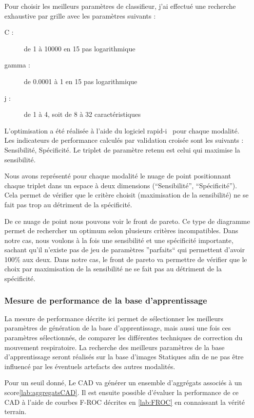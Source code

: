 Pour choisir les meilleurs paramètres de classifieur, j'ai effectué une recherche exhaustive par grille avec les paramètres suivants :

\begin{description}
 \item [C :] de 1 à 10000 en 15 pas logarithmique
 \item [gamma :] de 0.0001 à 1 en 15 pas logarithmique
 \item [j :] de 1 à 4, soit de 8 à 32 caractéristiques
\end{description}

L'optimisation a été réalisée à l'aide du logiciel rapid-i~\cite{mierswa2006} pour chaque modalité. Les indicateurs de performance calculés par validation croisée sont les suivants : Sensibilité, Spécificité. Le triplet de paramètre retenu est celui qui maximise la sensibilité.

Nous avons représenté pour chaque modalité le nuage de point positionnant chaque triplet dans un espace à deux dimensions (``Sensibilité'', ``Spécificité''). Cela permet de vérifier que le critère choisit (maximisation de la sensibilité) ne se fait pas trop au détriment de la spécificité.

De ce nuage de point nous pouvons voir le front de pareto. Ce type de diagramme permet de rechercher un optimum selon plusieurs critères incompatibles. Dans notre cas, nous voulons à la fois une sensibilité et une spécificité importante, sachant qu'il n'existe pas de jeu de paramètres ''parfaits`` qui permettent d'avoir 100\% aux deux. Dans notre cas, le front de pareto va permettre de vérifier que le choix par maximisation de la sensibilité ne se fait pas au détriment de la spécificité.


\subsubsection{Mesure de performance de la base d'apprentissage}

La mesure de performance décrite ici permet de sélectionner les meilleurs paramètres de génération de la base d'apprentissage, mais aussi une fois ces paramètres sélectionnés, de comparer les différentes techniques de correction du mouvement respiratoire. La recherche des meilleurs paramètres de la base d'apprentissage seront réalisés sur la base d'images Statiques afin de ne pas être influencé par les éventuels artefacts des autres modalités.

Pour un seuil donné, Le CAD va générer un ensemble d'aggrégats associés à un score\ref{lab:aggregatsCAD}. Il est ensuite possible d'évaluer la performance de ce CAD à l'aide de courbes F-ROC décrites en \ref{lab:FROC} en connaissant la vérité terrain.

